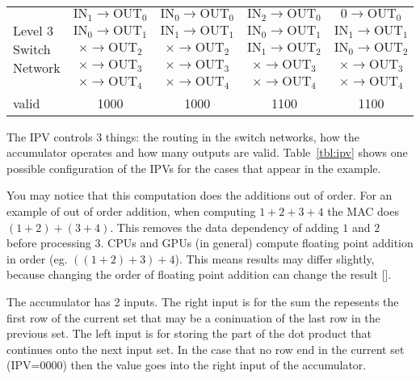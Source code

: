 \begin{table}
\begin{tabular}{m{2cm}cccc}
        \multirow{5}{*}{\parbox{2cm}{\centering Level 3 Switch Network}} &
        $\textrm{IN}_1 \rightarrow \textrm{OUT}_0$ &
        $\textrm{IN}_0 \rightarrow \textrm{OUT}_0$ &
        $\textrm{IN}_2 \rightarrow \textrm{OUT}_0$ &
        $0 \rightarrow \textrm{OUT}_0$\\
        & $\textrm{IN}_0 \rightarrow \textrm{OUT}_1$ &
        $\textrm{IN}_1 \rightarrow \textrm{OUT}_1$ &
        $\textrm{IN}_0 \rightarrow \textrm{OUT}_1$ &
        $\textrm{IN}_1 \rightarrow \textrm{OUT}_1$\\
        & $\times \rightarrow \textrm{OUT}_2$ &
        $\times \rightarrow \textrm{OUT}_2$ &
        $\textrm{IN}_1 \rightarrow \textrm{OUT}_2$ &
        $\textrm{IN}_0 \rightarrow \textrm{OUT}_2$\\
        & $\times \rightarrow \textrm{OUT}_3$ &
        $\times \rightarrow \textrm{OUT}_3$ &
        $\times \rightarrow \textrm{OUT}_3$ &
        $\times \rightarrow \textrm{OUT}_3$\\
        & $\times \rightarrow \textrm{OUT}_4$ &
        $\times \rightarrow \textrm{OUT}_4$ &
        $\times \rightarrow \textrm{OUT}_4$ &
        $\times \rightarrow \textrm{OUT}_4$\\

        \hline
        valid & 1000 & 1000 & 1100 & 1100 \\ 
        \hline
    \end{tabular}
\end{table}

The IPV controls 3 things: the routing in the switch networks, how the accumulator operates and how many outputs are valid. Table~\ref{tbl:ipv} shows one possible configuration of the IPVs for the cases that appear in the example.

You may notice that this computation does the additions out of order. For an example of out of order addition, when computing $1+2+3+4$ the MAC does $(1+2)+(3+4)$. This removes the data dependency of adding $1$ and $2$ before processing $3$. CPUs and GPUs (in general) compute floating point addition in order (eg. $\left((1+2)+3\right)+4$). This means results may differ slightly, because changing the order of floating point addition can change the result [\cite{prelim:goldberg}].

The accumulator has 2 inputs. The right input is for the sum the repesents the first row of the current set that may be a coninuation of the last row in the previous set. The left input is for storing the part of the dot product that continues onto the next input set. In the case that no row end in the current set (IPV=0000) then the value goes into the right input of the accumulator.

